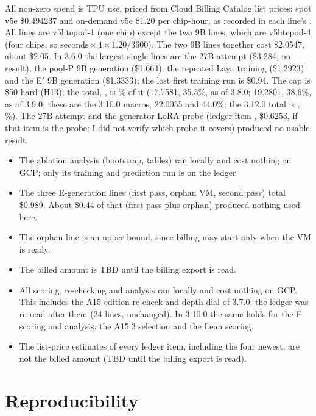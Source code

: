 \documentclass[11pt,a4paper]{article}
\newcommand{\TBD}{\textsf{TBD}}
\newcommand{\code}[1]{\texttt{\detokenize{#1}}}
\begin{document}
All non-zero spend is TPU use, priced from Cloud Billing Catalog list prices: spot v5e \$0.494237 and on-demand v5e
\$1.20 per chip-hour, as recorded in each line's \code{price_source}. All lines are v5litepod-1 (one chip) except the
two 9B lines, which are v5litepod-4 (four chips, so $\text{seconds}\times4\times1.20/3600$). The two 9B lines together
cost \$2.0547, about \$2.05. In 3.6.0 the largest single lines are the 27B attempt (\$3.284, no result), the pool-P 9B generation (\$1.664), the repeated Laya
training (\$1.2923) and the E$'$ 9B generation (\$1.3333); the lost first training run is \$0.94. The cap is \$50 hard (H13); the total, \SpendTotal, is \SpendCapShare\% of it (17.7581, 35.5\%, as of 3.8.0; 19.2801, 38.6\%, as of 3.9.0; these are the 3.10.0 macros, 22.0055 and 44.0\%; the 3.12.0 total is \SpendTotalNow, \SpendCapShareNow\%). The 27B attempt and the generator-LoRA probe (ledger item \code{tpu_laya-probe-114619}, \$0.6253, if that item is the probe; I did not verify which probe it covers) produced no usable result.
\begin{itemize}
\item The ablation analysis (bootstrap, tables) ran locally and cost nothing on GCP; only its training and prediction run is on the ledger.
\item The three E-generation lines (first pass, orphan VM, second pass) total \$0.989. About \$0.44
  of that (first pass plus orphan) produced nothing used here.
\item The orphan line is an upper bound, since billing may start only when the VM is ready.
\item The billed amount is \TBD{} until the billing export is read.
\item All scoring, re-checking and analysis ran locally and cost nothing on GCP. This includes the A15 edition re-check and depth dial of 3.7.0: the ledger was re-read after them (24 lines, unchanged). In 3.10.0 the same holds for the F scoring and analysis, the A15.3 selection and the Lean scoring.
\item The list-price estimates of every ledger item, including the four newest, are not the billed amount (\TBD{} until the billing export is read).
\end{itemize}

\section{Reproducibility}\label{sec:repro}
\end{document}
